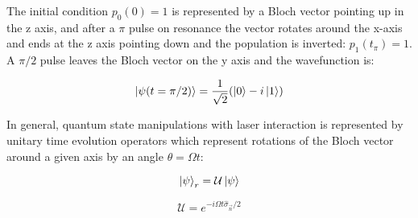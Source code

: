 The initial condition $p_{0}(0) = 1$ is represented by a Bloch vector pointing up in the z axis, and after a $\pi$ pulse on resonance the vector rotates around the x-axis and ends at the z axis pointing down and the population is inverted: $p_{1}(t_{\pi}) = 1$. A $\pi /2$ pulse leaves the Bloch vector on the y axis and the wavefunction is:

\begin{equation}
    \ket{\psi (t = \pi/2)} = \frac{1}{\sqrt{2}}(\ket{0} - i \ket{1})
\end{equation}

In general, quantum state manipulations with laser interaction is represented by unitary time evolution operators which represent rotations of the Bloch vector around a given axis by an angle $\theta = \Omega t$:

\begin{equation}
    \ket{\psi}_{r} = \mathcal{U} \ket{\psi}
\end{equation}

\begin{equation}
    \mathcal{U} = e^{- i \Omega t \hat{\sigma}_{\vec{n}} /2}
\end{equation}